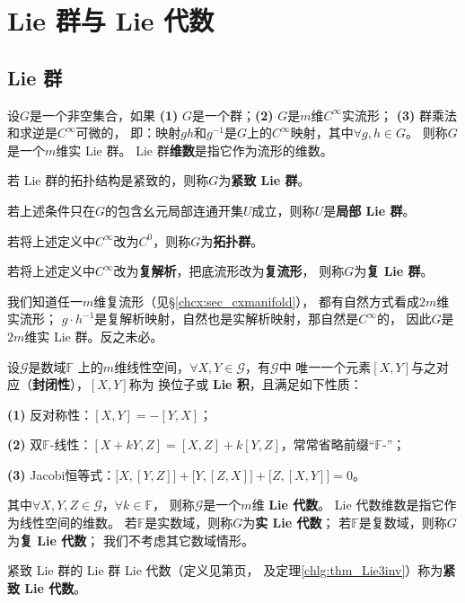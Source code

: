 \chapter{Lie 群与 Lie 代数}\label{appx:Lie-group}

\section{Lie 群}\label{chlg:sec_definition}

\begin{definition}\label{chlg:def_lg}
    设$G$是一个非空集合，如果
    {\bfseries (1)} $G$是一个群；{\bfseries (2)} $G$是$m$维$C^\infty$实流形；
    {\bfseries (3)} 群乘法和求逆是$C^\infty$可微的，
    即：映射$gh$和$g^{-1}$是$G$上的$C^\infty$映射，其中$\forall g,h\in G$。
    则称$G$是一个$m$维实 Lie 群。
     Lie 群\textbf{维数}是指它作为流形的维数。

    若 Lie 群的拓扑结构是紧致的，则称$G$为\textbf{紧致 Lie 群}。
    
    若上述条件只在$G$的包含幺元局部连通开集$U$成立，则称$U$是\textbf{局部 Lie 群}。
       
    若将上述定义中$C^\infty$改为$C^0$，则称$G$为\textbf{拓扑群}。
    
    若将上述定义中$C^\infty$改为\textbf{复解析}，把底流形改为\textbf{复流形}，
    则称$G$为\textbf{复 Lie 群}。
\end{definition}

我们知道任一$m$维复流形（见\S\ref{chcx:sec_cxmanifold}），
都有自然方式看成$2m$维实流形；
$g\cdot h^{-1}$是复解析映射，自然也是实解析映射，那自然是$C^\infty$的，
因此$G$是$2m$维实 Lie 群。反之未必。


\begin{definition}\label{chlg:def_la}
    设$\mathscr{G}$是数域$\mathbb{F}$ 
    上的$m$维线性空间，$\forall X,Y \in \mathscr{G}$，有$\mathscr{G}$中
    唯一一个元素$[X,Y]$与之对应（\textbf{封闭性}），$[X,Y]$称为
    换位子或\textbf{ Lie 积}，且满足如下性质：
    
    {\bfseries (1)} 反对称性：$[X,Y]=-[Y,X]$；
    
    {\bfseries (2)} 双$\mathbb{F}$-线性：$[ X + k Y, Z]= [X, Z]+ k[Y, Z]$，常常省略前缀“$\mathbb{F}$-”；
    
    {\bfseries (3)} Jacobi恒等式：$\bigl[X,[Y,Z]\bigr]+\bigl[Y,[Z,X]\bigr]+\bigl[Z,[X,Y]\bigr]=0$。
    
\noindent    其中$\forall X, Y, Z \in \mathscr{G}$，$\forall k \in \mathbb{F}$，
    则称$\mathscr{G}$是一个$m$维\textbf{ Lie 代数}。
     Lie 代数维数是指它作为线性空间的维数。
    若$\mathbb{F}$是实数域，则称$G$为\textbf{实 Lie 代数}；
    若$\mathbb{F}$是复数域，则称$G$为\textbf{复 Lie 代数}；
    我们不考虑其它数域情形。
    
    紧致 Lie 群的 Lie 群 Lie 代数（定义见第\pageref{chlg:eqn_LgXY}页，
    及定理\ref{chlg:thm_Lie3inv}）称为\textbf{紧致 Lie 代数}。
\end{definition}


